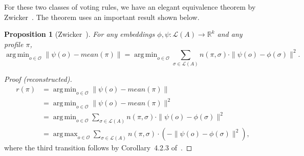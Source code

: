\documentclass[10pt,letterpaper]{article}
\newcommand{\calL}{{\mathcal{L}}}
\newcommand{\rank}{{\calL(A)}}
\newcommand{\calO}{{\mathcal{O}}}
\DeclareMathOperator*{\argmax}{arg\,max}
\DeclareMathOperator*{\argmin}{arg\,min}
\newtheorem{proposition}{Proposition}
\begin{document}


For these two classes of voting rules, we have an elegant equivalence theorem by Zwicker~\cite{Zwicker08a}. The theorem uses an important result shown below.

\begin{proposition}[Zwicker~\cite{Zwicker08a}]
For any embeddings $\phi,\psi : \rank \rightarrow \mathbb{R}^k$ and any profile $\pi$,
$$
\argmin_{o \in \calO} \|\psi(o)-mean(\pi)\| = \argmin_{o \in \calO} \sum_{\sigma \in \rank} n(\pi,\sigma) \cdot \|\psi(o)-\phi(\sigma)\|^2.
$$ 
\label{prop:MPR-GSR-conversion}
\end{proposition}
\begin{proof}[Proof (reconstructed)]
\begin{align*}
r(\pi)  &= \argmin_{o \in \calO} \|\psi(o)-mean(\pi)\| \\
&= \argmin_{o \in \calO} \|\psi(o)-mean(\pi)\|^2 \\
&= \argmin_{o \in \calO} \sum_{\sigma \in \rank} n(\pi,\sigma) \cdot \|\psi(o)-\phi(\sigma)\|^2 \\
&= \argmax_{o \in \calO} \sum_{\sigma \in \rank} n(\pi,\sigma) \cdot \left( -\|\psi(o)-\phi(\sigma)\|^2 \right), 
\end{align*}
where the third transition follows by Corollary~4.2.3 of~\cite{Zwicker08a}.%
\end{proof}
\end{document}

